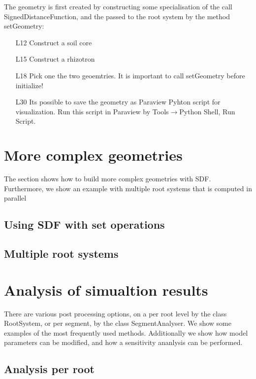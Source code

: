 \documentclass[a4paper]{article}
\begin{document}
The geometry is first created by constructing some specialisation of the call SignedDistanceFunction, and the passed to the root system by the method setGeometry: 
\begin{itemize}
 \item[L12] Construct a soil core 
 \item[L15] Construct a rhizotron
 \item[L18] Pick one the two geoemtries. It is important to call setGeometry before initialize!
 \item[L30] Its possible to save the geometry as Paraview Pyhton script for visualization. Run this script in Paraview by Tools$\rightarrow$Python Shell, Run Script.
\end{itemize}




\section{More complex geometries}

The section shows how to build more complex geometries with SDF. 
Furthermore, we show an example with multiple root systems that is computed in parallel

\subsection{Using SDF with set operations}

\subsection{Multiple root systems}



\section{Analysis of simualtion results}

There are various post processing options, on a per root level by the class RootSystem, or per segment, by the class SegmentAnalyser.
We show some examples of the most frequently used methods. Additionally we show how model parameters can be modified, 
and how a sensitivity ananlysis can be performed. 

\subsection{Analysis per root}
\end{document}
